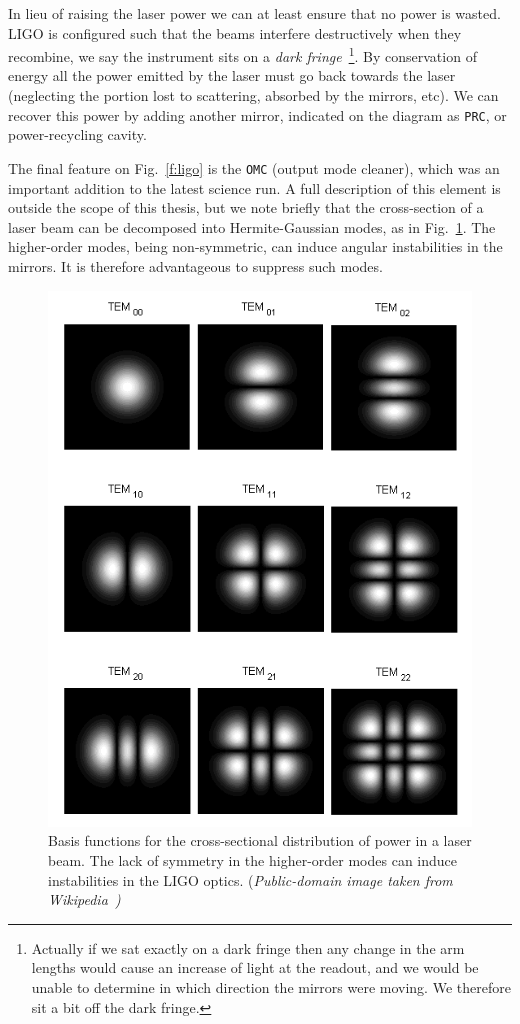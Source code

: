 In lieu of raising the laser power we can at least ensure that no
power is wasted.  LIGO is configured such that the beams interfere
destructively when they recombine, we say the instrument sits on a
\emph{dark fringe}~\footnote{Actually if we sat exactly on a dark
fringe then any change in the arm lengths would cause an increase of
light at the readout, and we would be unable to determine in which
direction the mirrors were moving.  We therefore sit a bit off the
dark fringe.}.  By conservation of energy all the power emitted by the
laser must go back towards the laser (neglecting the portion lost to
scattering, absorbed by the mirrors, etc).  We can recover this power
by adding another mirror, indicated on the diagram as \texttt{PRC}, or
power-recycling cavity.

The final feature on Fig.~\ref{f:ligo} is the \texttt{OMC} (output
mode cleaner), which was an important addition to the latest science
run.  A full description of this element is outside the scope of this
thesis, but we note briefly that the cross-section of a laser beam can
be decomposed into Hermite-Gaussian modes, as in
Fig.~\ref{f:hermite_gauss}.  The higher-order modes, being
non-symmetric, can induce angular instabilities in the mirrors.  It is
therefore advantageous to suppress such modes.

\begin{figure}
  \includegraphics[width=\linewidth]{figures/detectors/TEMmn}
  \caption[Laser modes]{
  \label{f:hermite_gauss}
Basis functions for the cross-sectional distribution of power in a
laser beam.  The lack of symmetry in the higher-order modes can induce
instabilities in the LIGO optics. (\it{Public-domain image taken from
Wikipedia}~\cite{wikipedia:temmn})
}
\end{figure}%


